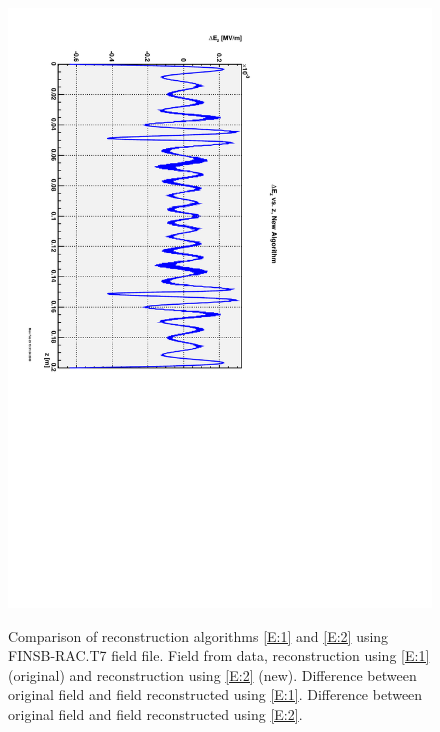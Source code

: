 \documentclass{report}
\begin{document}
\begin{figure}[hbt]
{    \includegraphics[scale=0.4,angle=90.0]{field-diff-new-FINSB-RAC.pdf}}
  \caption{Comparison of reconstruction algorithms \eqref{E:1} and \eqref{E:2} using FINSB-RAC.T7 field file.
     Field from data, reconstruction using \eqref{E:1} (original) and reconstruction using
    \eqref{E:2} (new).  Difference between original field and field reconstructed using \eqref{E:1}.
     Difference between original field and field reconstructed using \eqref{E:2}.}
  \label{Fi:figure-2}
\end{figure}
\end{document}
